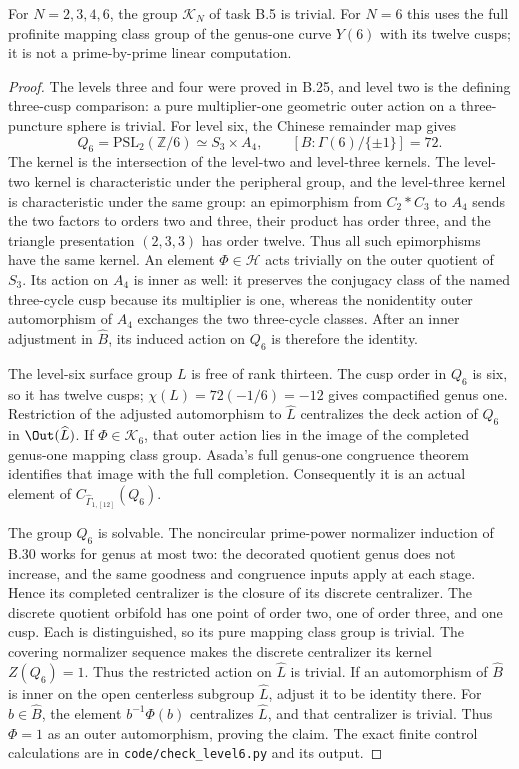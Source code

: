 For $N=2,3,4,6$, the group $\mathcal K_N$ of task B.5 is trivial.
For $N=6$ this uses the full profinite mapping class group of the
genus-one curve $Y(6)$ with its twelve cusps; it is not a
prime-by-prime linear computation.
\begin{proof}
The levels three and four were proved in B.25, and level two
is the defining three-cusp comparison: a pure multiplier-one
geometric outer action on a three-puncture sphere is trivial.
For level six, the Chinese remainder map gives
\[
 Q_6=\mathrm{PSL}_2(\mathbb Z/6)
           \simeq S_3\times A_4,
 \qquad [B:\Gamma(6)/\{\pm1\}]=72.
\]
The kernel is the intersection of the level-two and level-three
kernels. The level-two kernel is characteristic under the
peripheral group, and the level-three kernel is characteristic
under the same group: an epimorphism from $C_2*C_3$ to $A_4$
sends the two factors to orders two and three, their product
has order three, and the triangle presentation $(2,3,3)$
has order twelve. Thus all such epimorphisms have the same kernel.
An element $\Phi\in\mathcal H$ acts trivially on the outer
quotient of $S_3$. Its action on $A_4$ is inner as well:
it preserves the conjugacy class of the named three-cycle
cusp because its multiplier is one, whereas the nonidentity
outer automorphism of $A_4$ exchanges the two three-cycle
classes. After an inner adjustment in $\widehat B$, its
induced action on $Q_6$ is therefore the identity.

The level-six surface group $L$ is free of rank thirteen.
The cusp order in $Q_6$ is six, so it has twelve cusps;
$\chi(L)=72(-1/6)=-12$ gives compactified genus one.
Restriction of the adjusted automorphism to $\widehat L$
centralizes the deck action of $Q_6$ in $\Out(\widehat L)$.
If $\Phi\in\mathcal K_6$, that outer action lies in the
image of the completed genus-one mapping class group.
Asada's full genus-one congruence theorem\citep[Theorem 3A]{Asada2001} identifies that
image with the full completion. Consequently it is an
actual element of $C_{\widehat\Gamma_{1,[12]}}(Q_6)$.

The group $Q_6$ is solvable. The noncircular prime-power
normalizer induction of B.30 works for genus at most two:
the decorated quotient genus does not increase, and the
same goodness and congruence inputs apply at each stage.
Hence its completed centralizer is the closure of its
discrete centralizer. The discrete quotient orbifold has
one point of order two, one of order three, and one cusp.
Each is distinguished, so its pure mapping class group
is trivial. The covering normalizer sequence makes the
discrete centralizer its kernel $Z(Q_6)=1$.
Thus the restricted action on $\widehat L$ is trivial.
If an automorphism of $\widehat B$ is inner on the open
centerless subgroup $\widehat L$, adjust it to be identity
there. For $b\in\widehat B$, the element $b^{-1}\Phi(b)$
centralizes $\widehat L$, and that centralizer is trivial.
Thus $\Phi=1$ as an outer automorphism, proving the claim.
The exact finite control calculations are in
\texttt{code/check\_level6.py} and its output.
\end{proof}

